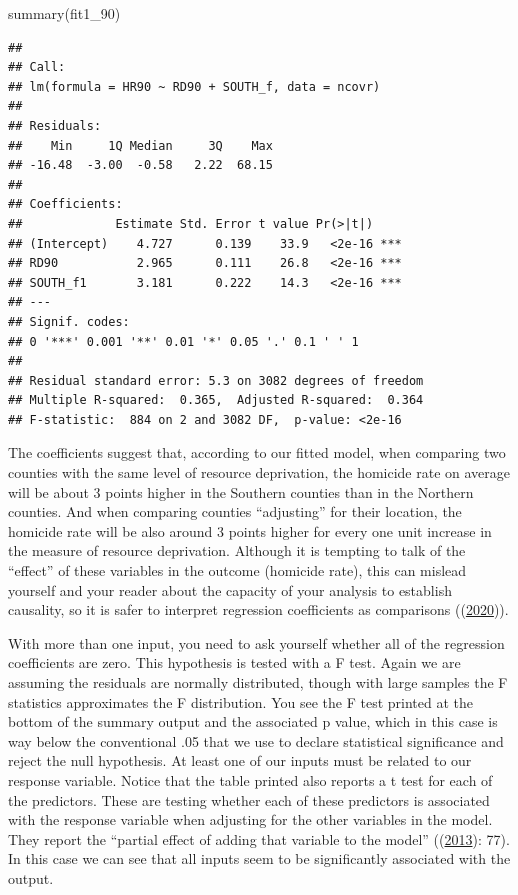 \documentclass[
  krantz2]{krantz}
\makeatletter
\newenvironment{Shaded}{\begin{snugshade}}{\end{snugshade}}
\newcommand{\FunctionTok}[1]{\textcolor[rgb]{0,0,0}{#1}}
\newcommand{\NormalTok}[1]{#1}
\newenvironment{kframe}{%
\medskip{}
\setlength{\fboxsep}{.8em}
 \def\at@end@of@kframe{}%
 \ifinner\ifhmode%
  \def\at@end@of@kframe{\end{minipage}}%
  \begin{minipage}{\columnwidth}%
 \fi\fi%
 \def\FrameCommand##1{\hskip\@totalleftmargin \hskip-\fboxsep
 \colorbox{shadecolor}{##1}\hskip-\fboxsep
     \hskip-\linewidth \hskip-\@totalleftmargin \hskip\columnwidth}%
 \MakeFramed {\advance\hsize-\width
   \@totalleftmargin\z@ \linewidth\hsize
   \@setminipage}}%
 {\par\unskip\endMakeFramed%
 \at@end@of@kframe}
\renewenvironment{Shaded}{\begin{kframe}}{\end{kframe}}
\makeatother
\begin{document}
\begin{Shaded}
\begin{Highlighting}[]
\FunctionTok{summary}\NormalTok{(fit1\_90)}
\end{Highlighting}
\end{Shaded}

\begin{verbatim}
## 
## Call:
## lm(formula = HR90 ~ RD90 + SOUTH_f, data = ncovr)
## 
## Residuals:
##    Min     1Q Median     3Q    Max 
## -16.48  -3.00  -0.58   2.22  68.15 
## 
## Coefficients:
##             Estimate Std. Error t value Pr(>|t|)    
## (Intercept)    4.727      0.139    33.9   <2e-16 ***
## RD90           2.965      0.111    26.8   <2e-16 ***
## SOUTH_f1       3.181      0.222    14.3   <2e-16 ***
## ---
## Signif. codes:  
## 0 '***' 0.001 '**' 0.01 '*' 0.05 '.' 0.1 ' ' 1
## 
## Residual standard error: 5.3 on 3082 degrees of freedom
## Multiple R-squared:  0.365,  Adjusted R-squared:  0.364 
## F-statistic:  884 on 2 and 3082 DF,  p-value: <2e-16
\end{verbatim}

The coefficients suggest that, according to our fitted model, when comparing two counties with the same level of resource deprivation, the homicide rate on average will be about 3 points higher in the Southern counties than in the Northern counties. And when comparing counties ``adjusting'' for their location, the homicide rate will be also around 3 points higher for every one unit increase in the measure of resource deprivation. Although it is tempting to talk of the ``effect'' of these variables in the outcome (homicide rate), this can mislead yourself and your reader about the capacity of your analysis to establish causality, so it is safer to interpret regression coefficients as comparisons ((\protect\hyperlink{ref-Gelman_2020}{2020})).

With more than one input, you need to ask yourself whether all of the regression coefficients are zero. This hypothesis is tested with a F test. Again we are assuming the residuals are normally distributed, though with large samples the F statistics approximates the F distribution. You see the F test printed at the bottom of the summary output and the associated p value, which in this case is way below the conventional .05 that we use to declare statistical significance and reject the null hypothesis. At least one of our inputs must be related to our response variable. Notice that the table printed also reports a t test for each of the predictors. These are testing whether each of these predictors is associated with the response variable when adjusting for the other variables in the model. They report the ``partial effect of adding that variable to the model'' ((\protect\hyperlink{ref-James_2013}{2013}): 77). In this case we can see that all inputs seem to be significantly associated with the output.
\end{document}
